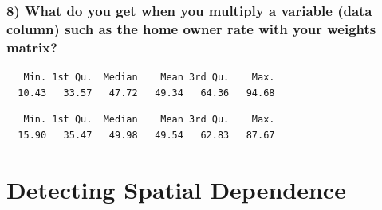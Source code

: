 \documentclass[
  letterpaper,
]{scrbook}
\newenvironment{Shaded}{\begin{snugshade}}{\end{snugshade}}
\newcommand{\CommentTok}[1]{\textcolor[rgb]{0.37,0.37,0.37}{#1}}
\newcommand{\FunctionTok}[1]{\textcolor[rgb]{0.28,0.35,0.67}{#1}}
\newcommand{\NormalTok}[1]{\textcolor[rgb]{0.00,0.23,0.31}{#1}}
\newcommand{\OtherTok}[1]{\textcolor[rgb]{0.00,0.23,0.31}{#1}}
\newcommand{\SpecialCharTok}[1]{\textcolor[rgb]{0.37,0.37,0.37}{#1}}
\begin{document}
\hypertarget{what-do-you-get-when-you-multiply-a-variable-data-column-such-as-the-home-owner-rate-with-your-weights-matrix}{%
\subsection*{8) What do you get when you multiply a variable (data
column) such as the home owner rate with your weights
matrix?}\label{what-do-you-get-when-you-multiply-a-variable-data-column-such-as-the-home-owner-rate-with-your-weights-matrix}}

\begin{Shaded}
\end{Shaded}

\begin{verbatim}
   Min. 1st Qu.  Median    Mean 3rd Qu.    Max. 
  10.43   33.57   47.72   49.34   64.36   94.68 
\end{verbatim}

\begin{Shaded}
\end{Shaded}

\begin{verbatim}
   Min. 1st Qu.  Median    Mean 3rd Qu.    Max. 
  15.90   35.47   49.98   49.54   62.83   87.67 
\end{verbatim}


\hypertarget{detecting-spatial-dependence}{%
\chapter{Detecting Spatial
Dependence}\label{detecting-spatial-dependence}}
\end{document}
